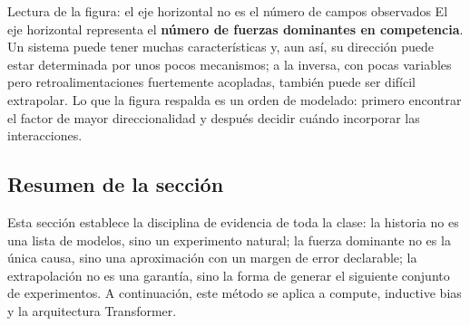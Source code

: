 

\begin{knowledgebox}{Lectura de la figura: el eje horizontal no es el número de campos observados}
El eje horizontal representa el \textbf{número de fuerzas dominantes en competencia}. Un sistema puede tener muchas características y, aun así, su dirección puede estar determinada por unos pocos mecanismos; a la inversa, con pocas variables pero retroalimentaciones fuertemente acopladas, también puede ser difícil extrapolar. Lo que la figura respalda es un orden de modelado: primero encontrar el factor de mayor direccionalidad y después decidir cuándo incorporar las interacciones.
\end{knowledgebox}


\subsection{Resumen de la sección}

Esta sección establece la disciplina de evidencia de toda la clase: la historia no es una lista de modelos, sino un experimento natural; la fuerza dominante no es la única causa, sino una aproximación con un margen de error declarable; la extrapolación no es una garantía, sino la forma de generar el siguiente conjunto de experimentos. A continuación, este método se aplica a compute, inductive bias y la arquitectura Transformer.

